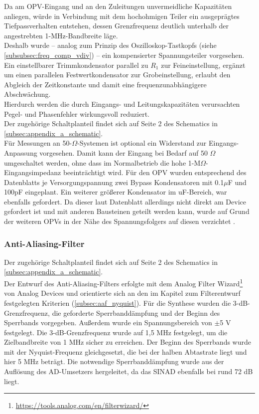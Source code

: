 \documentclass[a4paper, portrait, 12pt]{scrartcl} %
\begin{document}
Da am OPV-Eingang und an den Zuleitungen unvermeidliche Kapazitäten anliegen, würde in Verbindung mit dem hochohmigen Teiler ein ausgeprägtes Tiefpassverhalten entstehen, dessen Grenzfrequenz deutlich unterhalb der angestrebten 1-MHz-Bandbreite läge.\\
Deshalb wurde – analog zum Prinzip des Oszilloskop-Tastkopfs (siehe \autoref{subsubsec:freq_comp_vdiv}) – ein kompensierter Spannungsteiler vorgesehen.\\
Ein einstellbarer Trimmkondensator parallel zu $R_1$ zur Feineinstellung, ergänzt um einen parallelen Festwertkondensator zur Grobeinstellung, erlaubt den Abgleich der Zeitkonstante und damit eine frequenzunabhängigere Abschwächung.\\  
Hierdurch werden die durch Eingangs- und Leitungskapazitäten verursachten Pegel- und Phasenfehler wirkungsvoll reduziert.\\

Der zugehörige Schaltplanteil findet sich auf Seite 2 des Schematics in \autoref{subsec:appendix_a_schematic}.\\

Für Messungen an 50-$\Omega$-Systemen ist optional ein Widerstand zur Eingangs-Anpassung vorgesehen. Damit kann der Eingang bei Bedarf auf 50 $\Omega$ umgeschaltet werden, ohne dass im Normalbetrieb die hohe 1-M$\Omega$-Eingangsimpedanz beeinträchtigt wird. Für den OPV wurden entsprechend des Datenblatts je Versorgungspannung zwei Bypass Kondensatoren mit 0.1$\mu$F und 100pF eingeplant. Ein weiterer größerer Kondensator im uF-Bereich, war ebenfalls gefordert. Da dieser laut Datenblatt allerdings nicht direkt am Device gefordert ist und mit anderen Bausteinen geteilt werden kann, wurde auf Grund der weiteren OPVs in der Nähe des Spannungsfolgers auf diesen verzichtet \cite[S. 20]{TexasInstruments4631}.

\subsubsection{Anti-Aliasing-Filter}
\label{subsubsec:aaf_concept}

Der zugehörige Schaltplanteil findet sich auf Seite 2 des Schematics in \autoref{subsec:appendix_a_schematic}.\\

Der Entwurf des Anti-Aliasing-Filters erfolgte mit dem Analog Filter Wizard\footnote{\url{https://tools.analog.com/en/filterwizard/}} von Analog Devices und orientierte sich an den im Kapitel zum Filterentwurf festgelegten Kriterien (\autoref{subsec:aaf_nyquist}). Für die Synthese wurden die 3-dB-Grenzfrequenz, die geforderte Sperrbanddämpfung und der Beginn des Sperrbands vorgegeben. Außerdem wurde ein Spannungsbereich von $\pm$5 V festgelegt. Die 3-dB-Grenzfrequenz wurde auf 1,5 MHz festgelegt, um die Zielbandbreite von 1 MHz sicher zu erreichen. Der Beginn des Sperrbands wurde mit der Nyquist-Frequenz gleichgesetzt, die bei der halben Abtastrate liegt und hier 5 MHz beträgt. Die notwendige Sperrbanddämpfung wurde aus der Auflösung des AD-Umsetzers hergeleitet, da das SINAD ebenfalls bei rund 72 dB liegt.
\end{document}
